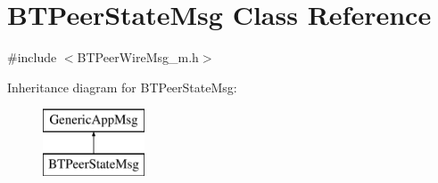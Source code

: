 \hypertarget{classBTPeerStateMsg}{}\section{B\+T\+Peer\+State\+Msg Class Reference}
\label{classBTPeerStateMsg}


{\ttfamily \#include $<$B\+T\+Peer\+Wire\+Msg\+\_\+m.\+h$>$}

Inheritance diagram for B\+T\+Peer\+State\+Msg\+:\begin{figure}[H]
\begin{center}
\leavevmode
\includegraphics[height=2.000000cm]{classBTPeerStateMsg}
\end{center}
\end{figure}
